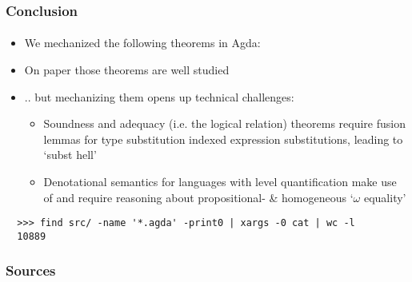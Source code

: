 \documentclass[dvipsnames,aspectratio=169,pdftex]{beamer}
\begin{document}
\begin{frame}[fragile]
  \frametitle{Conclusion}
  \framesubtitle{}
  \begin{itemize}
    \item We mechanized the following theorems in Agda: 
  \end{itemize}
  \begin{itemize} 
    \item On paper those theorems are well studied
    \item .. but mechanizing them opens up technical challenges:
    \begin{itemize} 
      \item Soundness and adequacy (i.e. the logical relation) theorems require fusion lemmas for type substitution indexed expression substitutions, leading to `subst hell'
      \item Denotational semantics for languages with level quantification make use of  and require reasoning about propositional- \& homogeneous `$\omega$ equality'
    \end{itemize}
  \end{itemize}
  \begin{verbatim} 
  >>> find src/ -name '*.agda' -print0 | xargs -0 cat | wc -l
  10889
  \end{verbatim}
\end{frame}

\begin{frame}[fragile]
  \frametitle{Sources}  
   
  
\end{frame}
\end{document}
